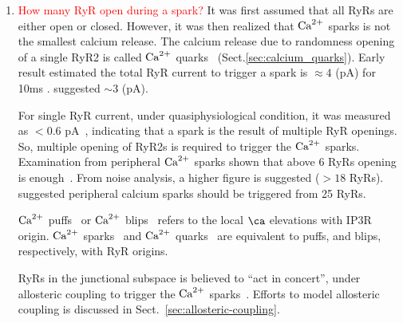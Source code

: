 \begin{enumerate}
\item \textcolor{red}{How many RyR open during a spark?} It was first assumed
that all RyRs are either open or closed. However, it was then realized that
${\text{Ca}^{2+}}$ sparks is not the smallest calcium release. The calcium release due to
randomness opening of a single RyR2 is called ${\text{Ca}^{2+}}$ quarks~\citep{lipp1996}
(Sect.\ref{sec:calcium_quarks}). Early result estimated the total RyR current to
trigger a spark is $\approx 4$ (pA) for 10ms \citep{cheng1993cse}.
\citep{blatter1997} suggested $\sim 3$ (pA).
  
  For single RyR current, under quasiphysiological condition, it was measured
  as $< 0.6$ pA~\citep{mejia-alvarez1999}, indicating that a spark is the
  result of multiple RyR openings.
  So, multiple opening of RyR2s is required to trigger the ${\text{Ca}^{2+}}$ sparks.
  Examination from peripheral ${\text{Ca}^{2+}}$ sparks shown that above 6 RyRs opening is
  enough~\citep{shen2004}. From noise analysis, a higher figure is suggested
  ($> 18$ RyRs).~\citep{Baddeley2009} suggested peripheral calcium sparks should be
  triggered from 25 RyRs.


  \begin{framed}  
    ${\text{Ca}^{2+}}$ puffs~\citep{parker1991rr} or ${\text{Ca}^{2+}}$ blips~\citep{parker1996cta}
    refers to the local $\ca$ elevations with IP3R origin.  ${\text{Ca}^{2+}}$
    sparks~\citep{cheng1993cse} and ${\text{Ca}^{2+}}$ quarks~\citep{lipp1996} are
    equivalent to puffs, and blips, respectively, with RyR origins.
  \end{framed}
  
  RyRs in the junctional subspace is believed to ``act in concert'',
  under allosteric coupling to trigger the ${\text{Ca}^{2+}}$
  sparks~\citep{marx1998}.  Efforts to model allosteric coupling is
  discussed in Sect.~\ref{sec:allosteric-coupling}.
\end{enumerate}

